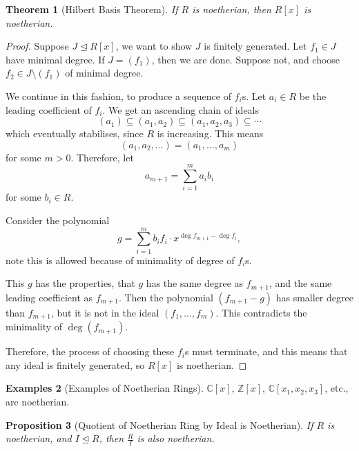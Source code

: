 \documentclass{article}
\newtheorem{theorem}{Theorem}[section]
\newtheorem{proposition}[theorem]{Proposition}
\theoremstyle{definition}
\newtheorem{examples}[theorem]{Examples}
\theoremstyle{remark}
\newcommand{\pqty}[1]{\left(#1\right)}
\newcommand{\bqty}[1]{\left[#1\right]}
\newcommand{\flatfrac}[2]{\frac{#1}{#2}}
\newcommand{\idealsub}{\trianglelefteq}
\newcommand{\ZZ}{\mathbb{Z}}
\newcommand{\CC}{\mathbb{C}}
\begin{document}
\begin{theorem}[Hilbert Basis Theorem]
    If \(R\) is noetherian, then \(R\bqty{x}\) is noetherian.
\end{theorem}

\begin{proof}
    Suppose \(J \idealsub R\bqty{x}\), we want to show \(J\) is finitely generated. Let \(f_1 \in J\) have minimal degree. If \(J = \pqty{f_1}\), then we are done. Suppose not, and choose \(f_2 \in J \setminus \pqty{f_1}\) of minimal degree.

    We continue in this fashion, to produce a sequence of \(f_i\)s. Let \(a_i \in R\) be the leading coefficient of \(f_i\). We get an ascending chain of ideals
    \[
        \pqty{a_1} \subseteq \pqty{a_1, a_2} \subseteq \pqty{a_1, a_2, a_3} \subseteq \cdots
    \]
    which eventually stabilises, since \(R\) is increasing. This means
    \[
        \pqty{a_1, a_2, \ldots} = \pqty{a_1, \ldots, a_m}
    \]
    for some \(m > 0\). Therefore, let
    \[
        a_{m + 1} = \sum_{i = 1}^{m} a_i b_i
    \]
    for some \(b_i \in R\).

    Consider the polynomial
    \[
        g = \sum_{i = 1}^{m} b_i f_i \cdot x^{\deg f_{m + 1} - \deg f_i},
    \]
    note this is allowed because of minimality of degree of \(f_i\)s.

    This \(g\) has the properties, that \(g\) has the same degree as \(f_{m + 1}\), and the same leading coefficient as \(f_{m + 1}\). Then the polynomial \(\pqty{f_{m + 1} - g}\) has smaller degree than \(f_{m + 1}\), but it is not in the ideal \(\pqty{f_1, \ldots, f_m}\). This contradicts the minimality of \(\deg\pqty{f_{m + 1}}\).

    Therefore, the process of choosing these \(f_i\)s must terminate, and this means that any ideal is finitely generated, so \(R\bqty{x}\) is noetherian.
\end{proof}

\begin{examples}[Examples of Noetherian Rings]
    \label{ex:noetherian-rings}%
    \(\CC\bqty{x}\), \(\ZZ\bqty{x}\), \(\CC\bqty{x_1, x_2, x_3}\), etc., are noetherian.
\end{examples}

\begin{proposition}[Quotient of Noetherian Ring by Ideal is Noetherian]
    \label{prop:quotient-noetherian-by-ideal-noetherian}%
    If \(R\) is noetherian, and \(I \idealsub R\), then \(\flatfrac{R}{I}\) is also noetherian.
\end{proposition}
\end{document}
